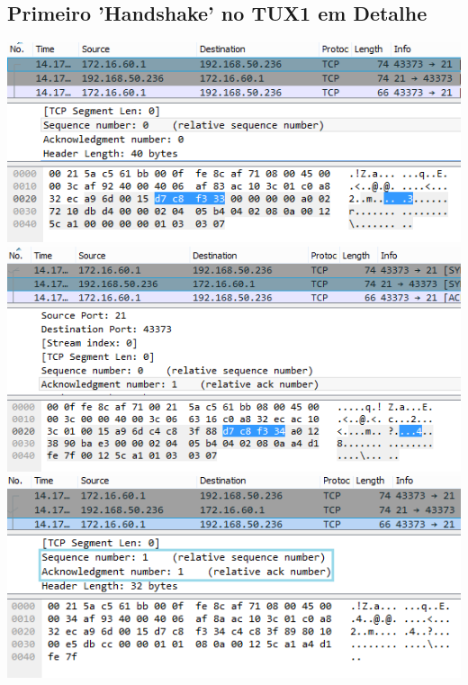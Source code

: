 \documentclass[11pt,a4paper,reqno]{report}
\numberwithin{equation}{section}
\begin{document}
\begin{appendices}
\subsection{Primeiro 'Handshake' no TUX1 em Detalhe}
\label{ex6_tux1_1sthandshake}
\includegraphics[width=18cm]{ex6_handshake1.png}
\includegraphics[width=18cm]{ex6_handshake2.png}
\includegraphics[width=18cm]{ex6_handshake3.png}


\end{appendices}
\end{document}
